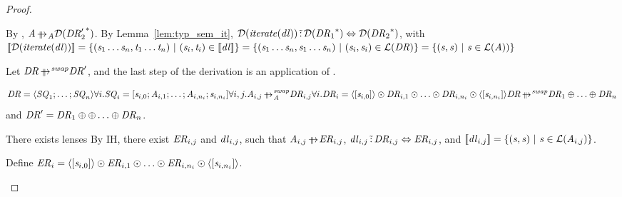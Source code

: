 \documentclass[numbers,10pt,preprint\ifanon ,nocopyrightspace\fi]{sigplanconf}
\begin{document}
\begin{proof}
\begin{case}[\ParallelSwapAtomStructuralRewriteRule{}]
    By \ParallelSwapAtomStructuralRewriteRule{},
    $\Atom \ParallelRewriteAtom \AtomToDNFOf{\StarOf{\DNFRegex_2'}}$.
    By Lemma~\ref{lem:typ_sem_it},
    $\mathcal{D}(\mathit{\mathit{iterate}(\mathit{dl})}) \,\tilde{:}\,
    \mathcal{D}({\mathit{DR}_1}^*) \Leftrightarrow
    \mathcal{D}({\mathit{DR}_2}^*)$, with
    $[ \! [\mathcal{D}(\mathit{\mathit{iterate}(\mathit{dl})})] \! ]
    = \{(\mathit{s}_1\ldots\mathit{s}_n,\mathit{t}_1\ldots\mathit{t}_n)
      ~|~ (\mathit{s}_i,\mathit{t}_i) \in [ \! [\mathit{dl}] \! ]\}
    = \{(\mathit{s}_1\ldots\mathit{s}_n,\mathit{s}_1\ldots\mathit{s}_n)
      ~|~ (\mathit{s}_i,\mathit{s}_i) \in \mathcal{L}(\mathit{DR})\}
    = \{(\mathit{s},\mathit{s}) ~|~ \mathit{s} \in \mathcal{L}(\mathit{A}))\}$
  \end{case}

  \begin{case}[\ParallelSwapDNFStructuralRewriteRule{}]
    Let $\DNFRegex \ParallelRewriteSwap \DNFRegex'$, and the last step of the
    derivation is an application of \ParallelSwapDNFStructuralRewriteRule{}.

    \[
      {
        \DNFRegex = \DNFOf{\Sequence_1;\ldots;\Sequence_n}\\
        \forall i. \Sequence_i =
        \SequenceOf{\String_{i,0};\Atom_{i,1};\ldots;\Atom_{i,n_i};\String_{i,n_i}}\\
        \forall i,j. \Atom_{i,j} \ParallelRewriteSwapAtom \DNFRegex_{i,j}\\
        \forall i. \DNFRegex_i = \DNFOf{\SequenceOf{\String_{i,0}}} \ConcatDNF \DNFRegex_{i,1}
        \ConcatDNF \ldots \ConcatDNF \DNFRegex_{i,n_i} \ConcatDNF
        \DNFOf{\SequenceOf{\String_{i,n_i}}}
      }
      {
        \DNFRegex \ParallelRewriteSwap \DNFRegex_1 \OrDNF \ldots \OrDNF \DNFRegex_n
      }
    \]
    and $\mathit{DR}' = \mathit{DR}_1 \oplus \oplus \ldots \oplus \mathit{DR}_n$.

    There exists lenses
    By IH, there exist $\mathit{ER}_{i,j}$ and $\mathit{dl}_{i,j}$, such that
    $\Atom_{i,j} \ParallelRewrite \DNFRegexAlt_{i,j}$,
    $\mathit{dl}_{i,j} \,\tilde{:}\,
    \mathit{DR}_{i,j} \Leftrightarrow \mathit{ER}_{i,j}$,
    and $[ \! [\mathit{dl}_{i,j}] \! ] =
    \{(\mathit{s},\mathit{s}) ~|~ \mathit{s} \in \mathcal{L}(\mathit{A}_{i,j})\}$.

    Define $\mathit{ER}_i =
    \langle[\mathit{s}_{i,0}]\rangle \odot \mathit{ER}_{i,1}
    \odot \ldots \odot
    \mathit{ER}_{i,n_i} \odot \langle[\mathit{s}_{i,n_i}]\rangle$.


\end{case}
\end{proof}
\end{document}
